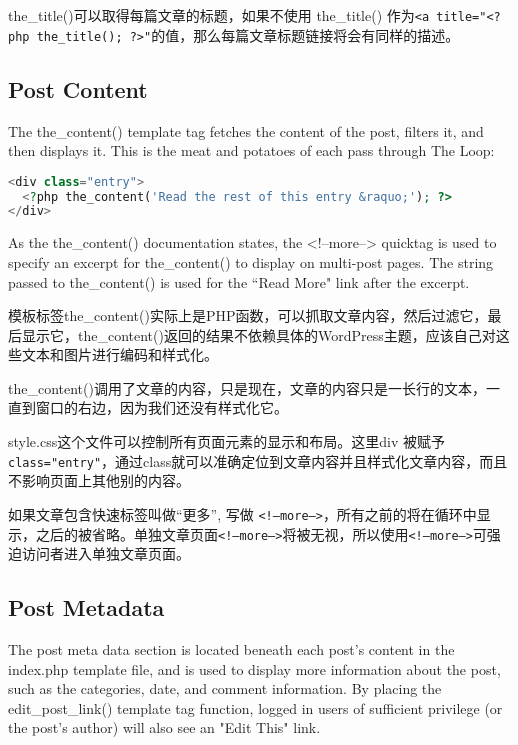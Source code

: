 the\_title()可以取得每篇文章的标题，如果不使用 the\_title() 作为\texttt{<a title="<?php the\_title(); ?>"}的值，那么每篇文章标题链接将会有同样的描述。




\subsection{Post Content}

The the\_content() template tag fetches the content of the post, filters it, and then displays it. This is the meat and potatoes of each pass through The Loop:

\begin{lstlisting}[language=PHP]
<div class="entry">
  <?php the_content('Read the rest of this entry &raquo;'); ?>
</div>
\end{lstlisting}

As the the\_content() documentation states, the <!--more--> quicktag is used to specify an excerpt for the\_content() to display on multi-post pages. The string passed to the\_content() is used for the ``Read More" link after the excerpt. 

模板标签the\_content()实际上是PHP函数，可以抓取文章内容，然后过滤它，最后显示它，the\_content()返回的结果不依赖具体的WordPress主题，应该自己对这些文本和图片进行编码和样式化。

the\_content()调用了文章的内容，只是现在，文章的内容只是一长行的文本，一直到窗口的右边，因为我们还没有样式化它。

style.css这个文件可以控制所有页面元素的显示和布局。这里div 被赋予 \texttt{class="entry"}，通过class就可以准确定位到文章内容并且样式化文章内容，而且不影响页面上其他别的内容。

如果文章包含快速标签叫做“更多”, 写做 \texttt{<!--more-->}，所有之前的将在循环中显示，之后的被省略。单独文章页面\texttt{<!--more-->}将被无视，所以使用\texttt{<!--more-->}可强迫访问者进入单独文章页面。

\subsection{Post Metadata}

The post meta data section is located beneath each post's content in the index.php template file, and is used to display more information about the post, such as the categories, date, and comment information. By placing the edit\_post\_link() template tag function, logged in users of sufficient privilege (or the post's author) will also see an "Edit This" link.



